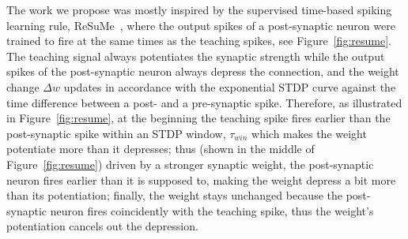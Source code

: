 The work we propose was mostly inspired by the supervised time-based spiking learning rule, ReSuMe~\citep{ponulak2010supervised}, where the output spikes of a post-synaptic neuron were trained to fire at the same times as the teaching spikes, see Figure~\ref{fig:resume}.
The teaching signal always potentiates the synaptic strength while the output spikes of the post-synaptic neuron always depress the connection, and the weight change $\Delta w$ updates in accordance with the exponential STDP curve against the time difference between a post- and a pre-synaptic spike.
Therefore, as illustrated in Figure~\ref{fig:resume}, at the beginning the teaching spike fires earlier than the post-synaptic spike within an STDP window, $\tau_{win}$ which makes the weight potentiate more than it depresses;
thus (shown in the middle of Figure~\ref{fig:resume}) driven by a stronger synaptic weight, the post-synaptic neuron fires earlier than it is supposed to, making the weight depress a bit more than its potentiation;
finally, the weight stays unchanged because the post-synaptic neuron fires coincidently with the teaching spike, thus the weight's potentiation cancels out the depression.
